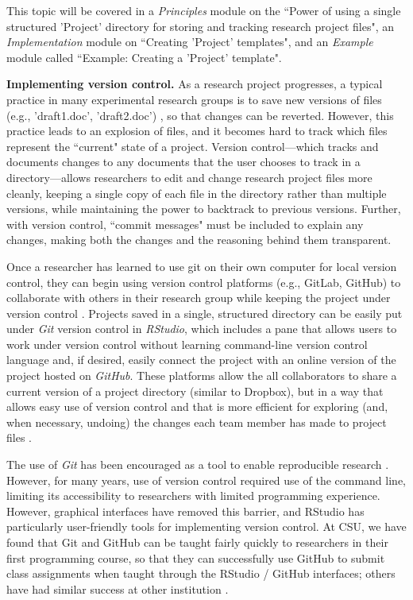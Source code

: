 \documentclass[pdftex,english,11pt,parskip=half]{scrartcl}
\begin{document}
This topic will be
covered in a \textit{Principles} module on the ``Power of using a single
structured 'Project' directory for storing and tracking research project files",
an \textit{Implementation} module on ``Creating 'Project' templates", and an
\textit{Example} module called ``Example: Creating a 'Project' template".

\textbf{Implementing version control.} As a research project progresses, a typical practice in many experimental research groups is to save new versions of files (e.g., 'draft1.doc', 'draft2.doc') \cite{bryan2018excuse}, so that changes can be reverted. However, this practice leads to an explosion of files, and it becomes hard to track which files represent the ``current" state of a project. Version control---which tracks and documents changes to any documents that the user chooses to track in a directory---allows researchers to edit and change research project files more cleanly, keeping a single copy of each file in the directory rather than multiple versions, while maintaining the power to backtrack to previous versions. Further, with version control, ``commit messages" must be included to explain any changes, making both the changes and the reasoning behind them transparent. 

Once a researcher has learned to use git on their own computer for local version control, they can begin using version control 
platforms (e.g., GitLab, GitHub) to collaborate with others in their research
group while keeping the project under version control \cite{bryan2018excuse, shade2015computing}. Projects saved in a single, structured directory
can be easily put under \textit{Git} version control in \textit{RStudio}, which
includes a pane that allows users to work under version control without learning
command-line version control language and, if desired, easily connect the
project with an online version of the project hosted on \textit{GitHub}. These platforms allow
the all collaborators to share a current version of a project directory 
(similar to Dropbox), but in a way that allows easy use of version control 
and that is more efficient for exploring (and, when necessary, undoing) the changes 
each team member has made to project files \cite{bryan2018excuse}. 

The use of \textit{Git} has been encouraged as a tool to enable reproducible research \cite{piccolo2016tools, ram2013git, bryan2018excuse, lowndes2017our, cetinkaya2017infrastructure}. However, for many years, use of version control required use of the command line,
limiting its accessibility to researchers with limited programming experience.
However, graphical interfaces have removed this barrier, and RStudio has 
particularly user-friendly tools for implementing version control. At CSU, we have found that Git and GitHub can be taught fairly quickly to researchers in their first programming course, so that they can successfully use GitHub to submit class assignments when taught through the RStudio / GitHub interfaces; others have had similar success at other institution \cite{bryan2018excuse}.
\end{document}
